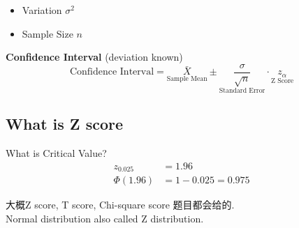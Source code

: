 \documentclass[a4paper]{report}
\begin{document}
\begin{itemize}
  \item Variation $\sigma^2$
  \item Sample Size $n$
\end{itemize}
\textbf{Confidence Interval} (deviation known)
$$\text{Confidence Interval}=\underset{\text{Sample Mean}}{\bar{X}}\pm \underset{\text{Standard Error}}{\frac{\sigma}{\sqrt{n}}}\cdot \underset{\text{Z Score}}{z_\alpha}$$
\subsection{What is Z score}
What is Critical Value? 
\begin{align*}
  z_{0.025}&=1.96\\
  \Phi(1.96)&=1-0.025=0.975
\end{align*}

大概Z score, T score, Chi-square score 题目都会给的. \\
Normal distribution also called Z distribution. 
          
\end{document}
